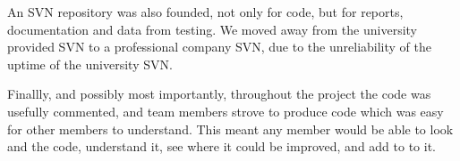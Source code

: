 An SVN repository was also founded, not only for code, but for reports, documentation and data from testing. We moved away from the university provided SVN to a professional company SVN, due to the unreliability of the uptime of the university SVN.\linebreak 

Finallly, and possibly most importantly, throughout the project the code was usefully commented, and team members strove to produce code which was easy for other members to understand. This meant any member would be able to look and the code, understand it, see where it could be improved, and add to to it.
